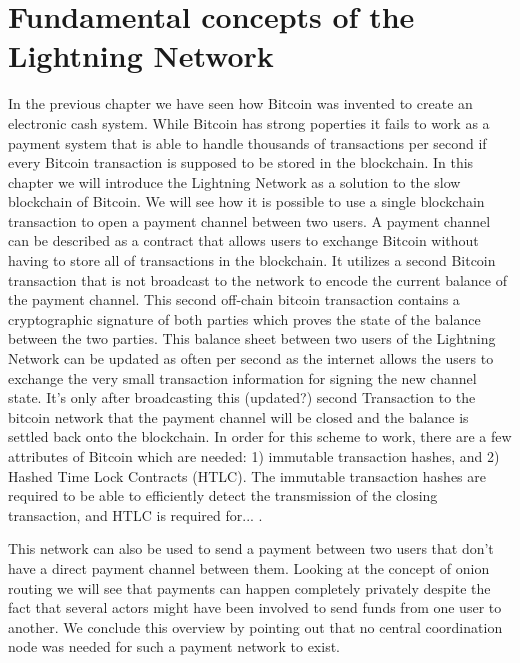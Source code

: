 \documentclass[a4paper,12pt,oneside,openany]{book}
\begin{document}
\chapter{Fundamental concepts of the Lightning Network}
In the previous chapter we have seen how Bitcoin was invented to create an electronic cash system.
While Bitcoin has strong poperties it fails to work as a payment system that is able to handle thousands of transactions per second if every Bitcoin transaction is supposed to be stored in the blockchain.
In this chapter we will introduce the Lightning Network as a solution to the slow blockchain of Bitcoin.
We will see how it is possible to use a single blockchain transaction to open a payment channel between two users.
A payment channel can be described as a contract that allows users to exchange Bitcoin without having to store all of transactions in the blockchain.
It utilizes a second Bitcoin transaction that is not broadcast to the network to encode the current balance of the payment channel.
This second off-chain bitcoin transaction contains a cryptographic signature of both parties which proves the state of the balance between the two parties.
This balance sheet between two users of the Lightning Network can be updated as often per second as the internet allows the users to exchange the very small transaction information for signing the new channel state.
It's only after broadcasting this (updated?) second Transaction to the bitcoin network that the payment channel will be closed and the balance is settled back onto the blockchain.
In order for this scheme to work, there are a few attributes of Bitcoin which are needed: 1) immutable transaction hashes, and 2) Hashed Time Lock Contracts (HTLC).
The immutable transaction hashes are required to be able to efficiently detect the transmission of the closing transaction, and HTLC is required for... .


This network can also be used to send a payment between two users that don't have a direct payment channel between them.
Looking at the concept of onion routing we will see that payments can happen completely privately despite the fact that several actors might have been involved to send funds from one user to another.
We conclude this overview by pointing out that no central coordination node was needed for such a payment network to exist.
\end{document}
